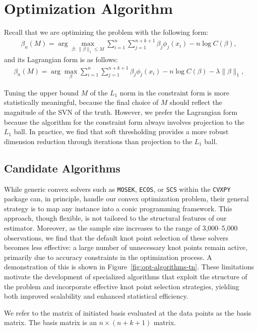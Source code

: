 \section{Optimization Algorithm} \label{sct: opt_alg}
Recall that we are optimizing the problem with the following form:
\begin{align}\label{constraint opt}
   \beta_n(M) = \arg\max_{\beta:\ \|\beta\|_1 \leq M} \sum_{i=1}^{n} \sum_{j=1}^{n+k+1} \beta_j \phi_j(x_i) - n\log C(\beta), 
\end{align} 
and its Lagrangian form is as follows:
\begin{align} \label{lag opt}
   \beta_n(M) = \arg\max_{\beta} \sum_{i=1}^{n} \sum_{j=1}^{n+k+1} \beta_j \phi_j(x_i) - n\log C(\beta) - \lambda \|\beta\|_1, 
\end{align} 

Tuning the upper bound $M$ of the $L_1$ norm in the constraint form is more statistically meaningful, because the final choice of $M$ should reflect the magnitude of the SVN of the truth. However, we prefer the Lagrangian form because the algorithm for the constraint form always involves projection to the $L_1$ ball. In practice, we find that soft thresholding provides a more robust dimension reduction through iterations than projection to the $L_1$ ball.

\subsection{Candidate Algorithms} \label{subsct: cand_alg}
While generic convex solvers such as \texttt{MOSEK}, \texttt{ECOS}, or \texttt{SCS} within the \texttt{CVXPY} package can, in principle, handle our convex optimization problem, their general strategy is to map any instance into a conic programming framework. This approach, though flexible, is not tailored to the structural features of our estimator. Moreover, as the sample size increases to the range of 3,000–5,000 observations, we find that the default knot point selection of these solvers becomes less effective: a large number of unnecessary knot points remain active, primarily due to accuracy constraints in the optimization process. A demonstration of this is shown in Figure~\ref{fig:opt-algorithms-tn}. These limitations motivate the development of specialized algorithms that exploit the structure of the problem and incorporate effective knot point selection strategies, yielding both improved scalability and enhanced statistical efficiency. 

We refer to the matrix of initiated basis evaluated at the data points as the basis matrix. The basis matrix is an $n \times (n+k+1)$ matrix. 
